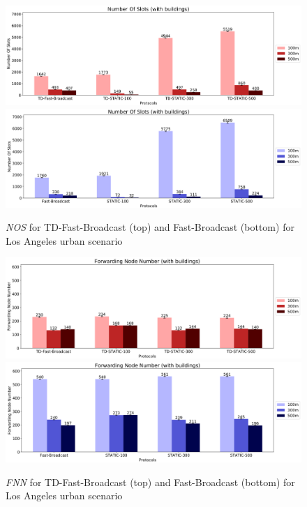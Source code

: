 		\begin{figure}[H]
			\centering
			\includegraphics[width=1.0\textwidth]{immagini/td-fb-la/td-fb/nos}	
			\includegraphics[width=1.0\textwidth]{immagini/td-fb-la/fb/nos}
			\caption{\textit{NOS} for TD-Fast-Broadcast (top) and Fast-Broadcast (bottom) for Los Angeles urban scenario}
			\label{fig:la-td-nos}
		\end{figure}
						
		\begin{figure}[H]
			\centering
			\includegraphics[width=1.0\textwidth]{immagini/td-fb-la/td-fb/fnn}	
			\includegraphics[width=1.0\textwidth]{immagini/td-fb-la/fb/fnn}
			\caption{\textit{FNN} for TD-Fast-Broadcast (top) and Fast-Broadcast (bottom) for Los Angeles urban scenario}
				\label{fig:la-td-fnn}
		\end{figure}
		

